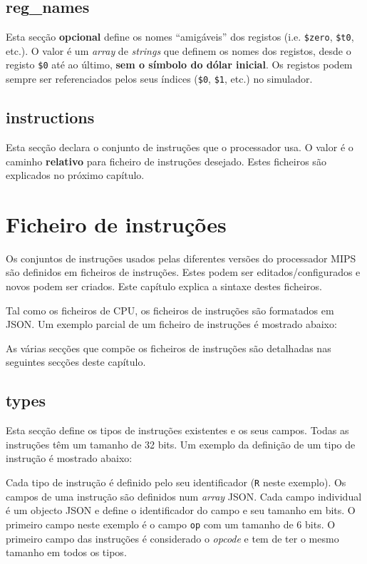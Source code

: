 \documentclass[11pt,a4paper,twoside,titlepage]{report}
\begin{document}
\section{reg\_names}

Esta secção \textbf{opcional} define os nomes ``amigáveis'' dos registos (i.e.
\verb+$zero+, \verb+$t0+, etc.).
O valor é um \emph{array} de \emph{strings} que definem os nomes dos registos,
desde o registo \verb+$0+ até ao último, \textbf{sem o símbolo do dólar inicial}.
Os registos podem sempre ser referenciados pelos seus índices (\verb+$0+,
\verb+$1+, etc.) no simulador.


\section{instructions}

Esta secção declara o conjunto de instruções que o processador usa.
O valor é o caminho \textbf{relativo} para ficheiro de instruções desejado.
Estes ficheiros são explicados no próximo capítulo.


\chapter{Ficheiro de instruções} \label{ch:set}

Os conjuntos de instruções usados pelas diferentes versões do processador MIPS
são definidos em ficheiros de instruções.
Estes podem ser editados/configurados e novos podem ser criados.
Este capítulo explica a sintaxe destes ficheiros.

Tal como os ficheiros de CPU, os ficheiros de instruções são formatados em JSON.
Um exemplo parcial de um ficheiro de instruções é mostrado abaixo:



As várias secções que compõe os ficheiros de instruções são detalhadas nas
seguintes secções deste capítulo.


\section{types}

Esta secção define os tipos de instruções existentes e os seus campos.
Todas as instruções têm um tamanho de 32 bits.
Um exemplo da definição de um tipo de instrução é mostrado abaixo:



Cada tipo de instrução é definido pelo seu identificador (\verb+R+ neste exemplo).
Os campos de uma instrução são definidos num \emph{array} JSON. Cada campo
individual é um objecto JSON e define o identificador do campo e seu tamanho em
bits. O primeiro campo neste exemplo é o campo \verb+op+ com um tamanho de 6 bits.
O primeiro campo das instruções é considerado o \emph{opcode} e tem de ter o
mesmo tamanho em todos os tipos.
\end{document}
